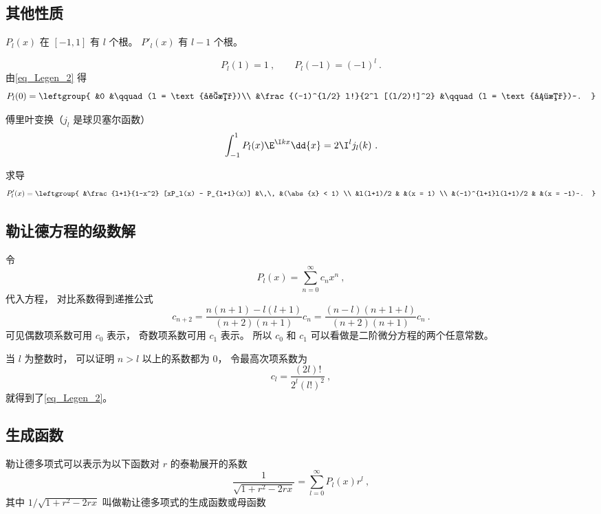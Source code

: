 \subsection{其他性质}

$P_l(x)$ 在 $[-1,1]$ 有 $l$ 个根。 $P'_l(x)$ 有 $l-1$ 个根。

\begin{equation}
P_l(1) = 1~, \qquad P_l(-1) = (-1)^l~.
\end{equation}
由\autoref{eq_Legen_2} 得
\begin{equation}\label{eq_Legen_5}
P_l(0) = \leftgroup{
&0 &\qquad (l = \text{奇数})\\
&\frac{(-1)^{l/2} l!}{2^l [(l/2)!]^2} &\qquad (l = \text{偶数})~.
}\end{equation}

傅里叶变换（$j_l$ 是球贝塞尔函数）
\begin{equation}\label{eq_Legen_3}
\int_{-1}^1 P_l(x) \E^{\I k x} \dd{x} = 2 \I^l j_l(k)~.
\end{equation}

求导
\begin{equation}\label{eq_Legen_6} %
P'_l(x) = \leftgroup{
    &\frac{l+1}{1-x^2} [xP_l(x) - P_{l+1}(x)] &\,\, &(\abs{x} < 1) \\
    &l(l+1)/2 & &(x = 1) \\
    &(-1)^{l+1}l(l+1)/2 & &(x = -1)~.
}\end{equation}

\subsection{勒让德方程的级数解}
令
\begin{equation}
P_l(x) = \sum_{n = 0}^\infty c_n x^n~,
\end{equation}
代入方程， 对比系数得到递推公式
\begin{equation}
c_{n+2} = \frac{n(n+1)-l(l+1)}{(n+2)(n+1)}c_n = \frac{(n-l)(n+1+l)}{(n+2)(n+1)}c_n~.
\end{equation}
可见偶数项系数可用 $c_0$ 表示， 奇数项系数可用 $c_1$ 表示。 所以 $c_0$ 和 $c_1$ 可以看做是二阶微分方程的两个任意常数。

当 $l$ 为整数时， 可以证明 $n > l$ 以上的系数都为 0， 令最高次项系数为
\begin{equation}
c_l = \frac{(2l)!}{2^l (l!)^2}~,
\end{equation}
就得到了\autoref{eq_Legen_2}。

\subsection{生成函数}
勒让德多项式可以表示为以下函数对 $r$ 的泰勒展开的系数
\begin{equation}
\frac{1}{\sqrt{1 + r^2 - 2rx}} = \sum_{l = 0}^\infty P_l(x) r^l~,
\end{equation}
其中 $1/\sqrt {1+ r^2 - 2rx}$ 叫做勒让德多项式的生成函数或母函数
